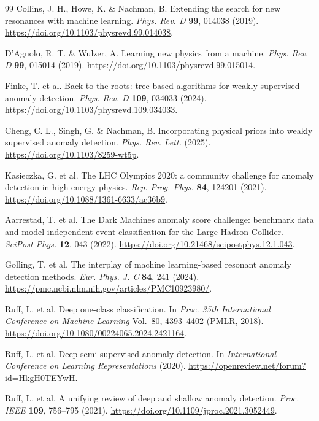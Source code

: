 \documentclass[11pt,a4paper]{article}
\begin{document}
\begin{thebibliography}{99}
 Collins, J. H., Howe, K. \& Nachman, B. Extending the search for new resonances with machine learning. \textit{Phys. Rev. D} \textbf{99}, 014038 (2019). \url{https://doi.org/10.1103/physrevd.99.014038}.

 D'Agnolo, R. T. \& Wulzer, A. Learning new physics from a machine. \textit{Phys. Rev. D} \textbf{99}, 015014 (2019). \url{https://doi.org/10.1103/physrevd.99.015014}.

 Finke, T. et al. Back to the roots: tree-based algorithms for weakly supervised anomaly detection. \textit{Phys. Rev. D} \textbf{109}, 034033 (2024). \url{https://doi.org/10.1103/physrevd.109.034033}.

 Cheng, C. L., Singh, G. \& Nachman, B. Incorporating physical priors into weakly supervised anomaly detection. \textit{Phys. Rev. Lett.} (2025). \url{https://doi.org/10.1103/8259-wt5p}.

 Kasieczka, G. et al. The LHC Olympics 2020: a community challenge for anomaly detection in high energy physics. \textit{Rep. Prog. Phys.} \textbf{84}, 124201 (2021). \url{https://doi.org/10.1088/1361-6633/ac36b9}.

 Aarrestad, T. et al. The Dark Machines anomaly score challenge: benchmark data and model independent event classification for the Large Hadron Collider. \textit{SciPost Phys.} \textbf{12}, 043 (2022). \url{https://doi.org/10.21468/scipostphys.12.1.043}.

 Golling, T. et al. The interplay of machine learning-based resonant anomaly detection methods. \textit{Eur. Phys. J. C} \textbf{84}, 241 (2024). \url{https://pmc.ncbi.nlm.nih.gov/articles/PMC10923980/}.

 Ruff, L. et al. Deep one-class classification. In \textit{Proc. 35th International Conference on Machine Learning} Vol.~80, 4393--4402 (PMLR, 2018). \url{https://doi.org/10.1080/00224065.2024.2421164}.

 Ruff, L. et al. Deep semi-supervised anomaly detection. In \textit{International Conference on Learning Representations} (2020). \url{https://openreview.net/forum?id=HkgH0TEYwH}.

 Ruff, L. et al. A unifying review of deep and shallow anomaly detection. \textit{Proc. IEEE} \textbf{109}, 756--795 (2021). \url{https://doi.org/10.1109/jproc.2021.3052449}.


\end{thebibliography}
\end{document}
